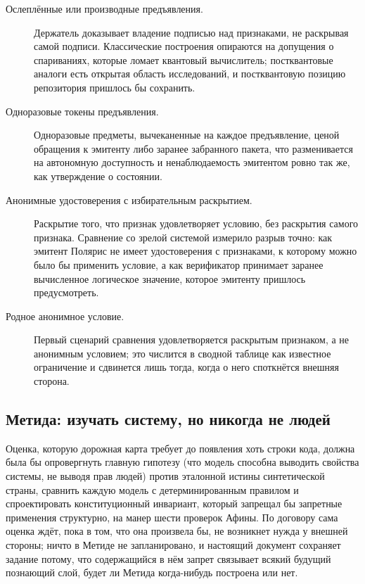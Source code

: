 \begin{description}
  \item[Ослеплённые или производные предъявления.] Держатель доказывает владение подписью над
    признаками, не раскрывая самой подписи. Классические построения опираются на допущения о
    спариваниях, которые ломает квантовый вычислитель; постквантовые аналоги есть открытая область
    исследований, и постквантовую позицию репозитория пришлось бы сохранить.
  \item[Одноразовые токены предъявления.] Одноразовые предметы, вычеканенные на каждое
    предъявление, ценой обращения к эмитенту либо заранее забранного пакета, что разменивается на
    автономную доступность и ненаблюдаемость эмитентом ровно так же, как утверждение о состоянии.
  \item[Анонимные удостоверения с избирательным раскрытием.] Раскрытие того, что признак
    удовлетворяет условию, без раскрытия самого признака. Сравнение со зрелой системой измерило
    разрыв точно: как эмитент Полярис не имеет удостоверения с признаками, к которому можно было бы
    применить условие, а как верификатор принимает заранее вычисленное логическое значение, которое
    эмитенту пришлось предусмотреть.
  \item[Родное анонимное условие.] Первый сценарий сравнения удовлетворяется раскрытым признаком,
    а не анонимным условием; это числится в сводной таблице как известное ограничение и сдвинется
    лишь тогда, когда о него споткнётся внешняя сторона.
\end{description}

\subsection{Метида: изучать систему, но никогда не людей}

Оценка, которую дорожная карта требует до появления хоть строки кода, должна была бы опровергнуть
главную гипотезу (что модель способна выводить свойства системы, не выводя прав людей) против
эталонной истины синтетической страны, сравнить каждую модель с детерминированным правилом и
спроектировать конституционный инвариант, который запрещал бы запретные применения структурно, на
манер шести проверок Афины. По договору сама оценка ждёт, пока в том, что она произвела бы, не
возникнет нужда у внешней стороны; ничто в Метиде не запланировано, и настоящий документ сохраняет
задание потому, что содержащийся в нём запрет связывает всякий будущий познающий слой, будет ли
Метида когда-нибудь построена или нет.

